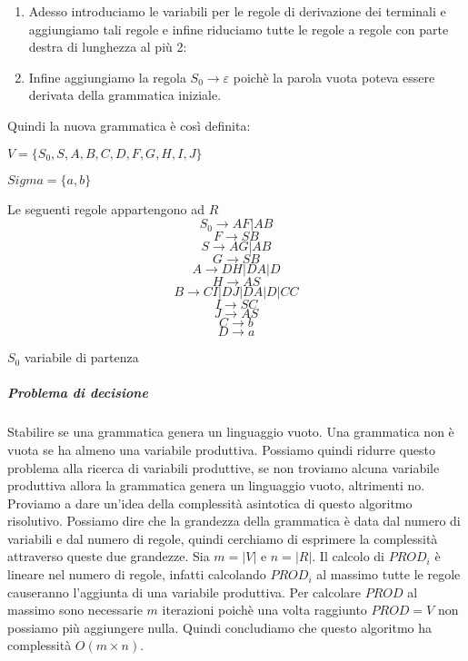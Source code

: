 \begin{enumerate}
\begin{description}
		\end{description}
		In questo passo la grammatica \`e rimasta invariata.
	\item Adesso introduciamo le variabili per le regole di derivazione dei terminali e aggiungiamo tali regole e infine riduciamo tutte le regole a regole con parte destra di lunghezza al pi\`u 2:
	\item Infine aggiungiamo la regola $S_0 \to \varepsilon$ poich\`e la parola vuota poteva essere derivata della grammatica iniziale.
\end{enumerate}
Quindi la nuova grammatica \`e cos\`i definita:
\begin{description}
	\item $V = \{S_0, S, A, B, C, D, F, G, H, I, J\}$
	\item $Sigma = \{a, b\}$
	\item Le seguenti regole appartengono ad $R$
	\[S_0 \to AF | AB\]
	\[F \to SB \]
	\[S \to AG | AB \]
	\[G \to SB \]
	\[A \to DH | DA | D \]
	\[H \to AS \]
	\[B \to CI | DJ | DA | D | CC\]
	\[I \to SC \]
	\[J \to AS \]
	\[C \to b\]
	\[D \to a\]	
	\item $S_0$ variabile di partenza
\end{description}
\subparagraph{Problema di decisione} Stabilire se una grammatica genera un linguaggio vuoto.\newline
Una grammatica non \`e vuota se ha almeno una variabile produttiva. Possiamo quindi ridurre questo problema alla ricerca di variabili produttive, se non troviamo alcuna variabile produttiva allora la grammatica genera un linguaggio vuoto, altrimenti no.\newline
Proviamo a dare un'idea della complessit\`a asintotica di questo algoritmo risolutivo. Possiamo dire che la grandezza della grammatica \`e data dal numero di variabili e dal numero di regole, quindi cerchiamo di esprimere la complessit\`a attraverso queste due grandezze. Sia $m = |V|$ e $n = |R|$. Il calcolo di $PROD_i$ \`e lineare nel numero di regole, infatti calcolando $PROD_i$ al massimo tutte le regole causeranno l'aggiunta di una variabile produttiva. Per calcolare $PROD$ al massimo sono necessarie $m$ iterazioni poich\`e una volta raggiunto $PROD = V$ non possiamo pi\`u aggiungere nulla. Quindi concludiamo che questo algoritmo ha complessit\`a $O(m \times n)$.
